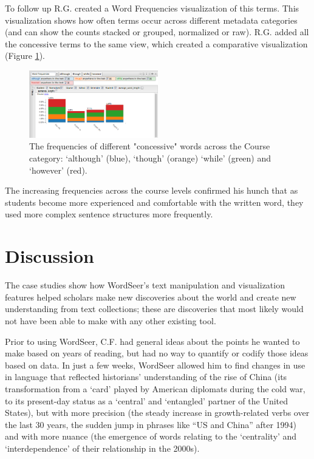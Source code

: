 \documentclass{sig-alternate}
\begin{document}
To follow up R.G. created a Word Frequencies visualization of this terms. This visualization shows how often terms occur across different metadata categories (and can show the counts stacked or grouped, normalized or raw). R.G. added all the concessive terms to the same view, which created a comparative visualization (Figure \ref{fig:rex05}).
\begin{figure}[h!]
\includegraphics[width=0.5\textwidth]{fig/rex/05.png}
\caption{The frequencies of different "concessive" words across the Course category: `although' (blue), `though' (orange) `while' (green) and `however' (red). \label{fig:rex05}}
\end{figure}
The increasing frequencies across the course levels confirmed his hunch that as students become more experienced and comfortable with the written word, they used more complex sentence structures more frequently. 

\section{Discussion}
The case studies show how WordSeer's text manipulation and visualization features helped scholars make new discoveries about the world and create new understanding from text collections; these are discoveries that most likely would not have been able to make with any other existing tool.

Prior to using WordSeer, C.F. had general ideas about the points he wanted to make based on years of reading, but had no way to quantify or codify those ideas based on data.  In just a few weeks, WordSeer allowed him to find changes in use in language that reflected historians' understanding of the rise of China (its transformation from a `card' played by American diplomats during the cold war,  to its present-day status as a `central' and `entangled' partner of the United States), but with more precision (the steady increase in growth-related verbs over the last 30 years, the sudden jump in  phrases like ``US and China'' after 1994) and with more nuance (the emergence of words relating to the `centrality' and `interdependence'  of their relationship in the 2000s).
\end{document}
